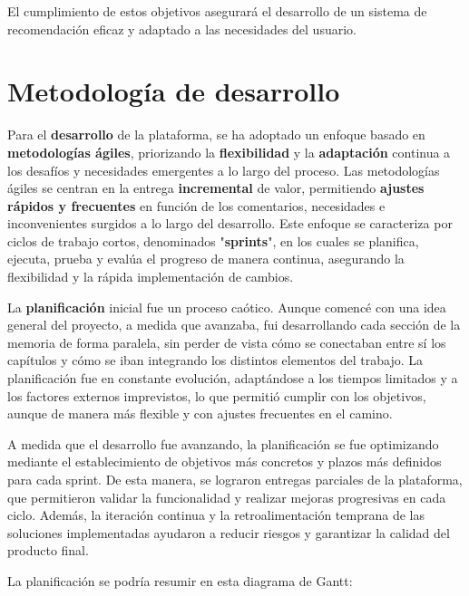 El cumplimiento de estos objetivos asegurará el desarrollo de un sistema de recomendación eficaz y adaptado a las necesidades del usuario.
\newpage
\section{Metodología de desarrollo}

Para el \textbf{desarrollo} de la plataforma, se ha adoptado un enfoque basado en \textbf{metodologías ágiles}, priorizando la \textbf{flexibilidad} y la \textbf{adaptación} continua a los desafíos y necesidades emergentes a lo largo del proceso. Las metodologías ágiles se centran en la entrega \textbf{incremental} de valor, permitiendo \textbf{ajustes rápidos y frecuentes} en función de los comentarios, necesidades e inconvenientes surgidos a lo largo del desarrollo. Este enfoque se caracteriza por ciclos de trabajo cortos, denominados "\textbf{sprints}", en los cuales se planifica, ejecuta, prueba y evalúa el progreso de manera continua, asegurando la flexibilidad y la rápida implementación de cambios.

La \textbf{planificación} inicial fue un proceso caótico. Aunque comencé con una idea general del proyecto, a medida que avanzaba, fui desarrollando cada sección de la memoria de forma paralela, sin perder de vista cómo se conectaban entre sí los capítulos y cómo se iban integrando los distintos elementos del trabajo. La planificación fue en constante evolución, adaptándose a los tiempos limitados y a los factores externos imprevistos, lo que permitió cumplir con los objetivos, aunque de manera más flexible y con ajustes frecuentes en el camino.

A medida que el desarrollo fue avanzando, la planificación se fue optimizando mediante el establecimiento de objetivos más concretos y plazos más definidos para cada sprint. De esta manera, se lograron entregas parciales de la plataforma, que permitieron validar la funcionalidad y realizar mejoras progresivas en cada ciclo. Además, la iteración continua y la retroalimentación temprana de las soluciones implementadas ayudaron a reducir riesgos y garantizar la calidad del producto final.

La planificación se podría resumir en esta diagrama de Gantt:

